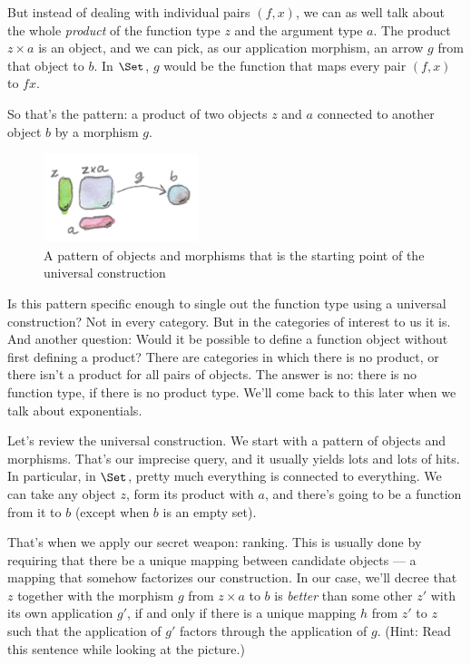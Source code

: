 \noindent
But instead of dealing with individual pairs $(f, x)$, we can as
well talk about the whole \emph{product} of the function type $z$
and the argument type $a$. The product $z\times{}a$ is an object,
and we can pick, as our application morphism, an arrow $g$ from
that object to $b$. In $\Set$, $g$ would be the
function that maps every pair $(f, x)$ to $f x$.

So that's the pattern: a product of two objects $z$ and
$a$ connected to another object $b$ by a morphism $g$.

\begin{figure}[H]
\centering
\includegraphics[width=0.4\textwidth]{images/functionpattern.jpg}
\caption{A pattern of objects and morphisms that is the starting point of the
universal construction}
\end{figure}

\noindent
Is this pattern specific enough to single out the function type using a
universal construction? Not in every category. But in the categories of
interest to us it is. And another question: Would it be possible to
define a function object without first defining a product? There are
categories in which there is no product, or there isn't a product for
all pairs of objects. The answer is no: there is no function type, if
there is no product type. We'll come back to this later when we talk
about exponentials.

Let's review the universal construction. We start with a pattern of
objects and morphisms. That's our imprecise query, and it usually yields
lots and lots of hits. In particular, in $\Set$, pretty much
everything is connected to everything. We can take any object
$z$, form its product with $a$, and there's going to be a
function from it to $b$ (except when $b$ is an empty set).

That's when we apply our secret weapon: ranking. This is usually done by
requiring that there be a unique mapping between candidate objects --- a
mapping that somehow factorizes our construction. In our case, we'll
decree that $z$ together with the morphism $g$ from
$z \times a$ to $b$ is \emph{better} than some other
$z'$ with its own application $g'$, if and
only if there is a unique mapping $h$ from $z'$ to
$z$ such that the application of $g'$ factors
through the application of $g$. (Hint: Read this sentence while
looking at the picture.)


